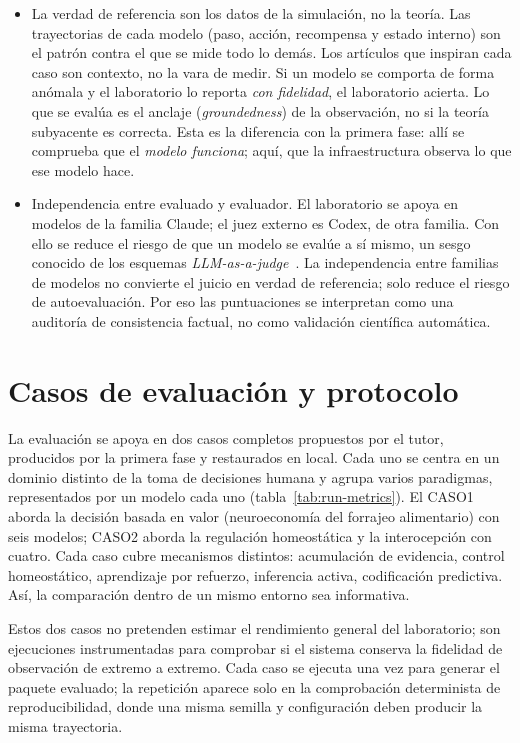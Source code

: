 \begin{itemize}
\item La verdad de referencia son los datos de la simulación, no la
teoría. Las trayectorias de cada modelo (paso, acción, recompensa y estado
interno) son el patrón contra el que se mide todo lo demás. Los artículos que
inspiran cada caso son contexto, no la vara de medir. Si un modelo se comporta de
forma anómala y el laboratorio lo reporta \emph{con fidelidad}, el laboratorio
acierta. Lo que se evalúa es el anclaje (\textit{groundedness}) de la
observación, no si la teoría subyacente es correcta. Esta es la diferencia con
la primera fase: allí se comprueba que el \emph{modelo funciona}; aquí, que la
infraestructura observa lo que ese modelo hace.

\item Independencia entre evaluado y evaluador. El laboratorio se apoya
en modelos de la familia Claude; el juez externo es Codex, de otra familia. Con
ello se reduce el riesgo de que un modelo se evalúe a sí mismo, un sesgo conocido
de los esquemas
\textit{LLM-as-a-judge}~\cite{zheng2023judge,calm2024biases}.
La independencia entre familias de modelos no convierte el juicio en verdad de
referencia; solo reduce el riesgo de autoevaluación. Por eso las puntuaciones se
interpretan como una auditoría de consistencia factual, no como validación
científica automática.
\end{itemize}

\section{Casos de evaluación y protocolo}

La evaluación se apoya en dos casos completos propuestos por el tutor,
producidos por la primera fase y restaurados en local. Cada uno se centra en un
dominio distinto de la toma de decisiones humana y agrupa varios paradigmas,
representados por un modelo cada uno (tabla~\ref{tab:run-metrics}). El
CASO1 aborda la decisión basada en valor (neuroeconomía del forrajeo
alimentario) con seis modelos; CASO2 aborda la regulación
homeostática y la interocepción con cuatro.
Cada caso cubre mecanismos distintos: acumulación de
evidencia, control homeostático, aprendizaje por refuerzo, inferencia activa,
codificación predictiva. Así, la comparación dentro de un mismo
entorno sea informativa.

Estos dos casos no pretenden estimar el rendimiento general del laboratorio;
son ejecuciones instrumentadas para comprobar si el sistema conserva la
fidelidad de observación de extremo a extremo. Cada caso se ejecuta una vez para
generar el paquete evaluado; la repetición aparece solo en la comprobación
determinista de reproducibilidad, donde una misma semilla y configuración deben
producir la misma trayectoria.

